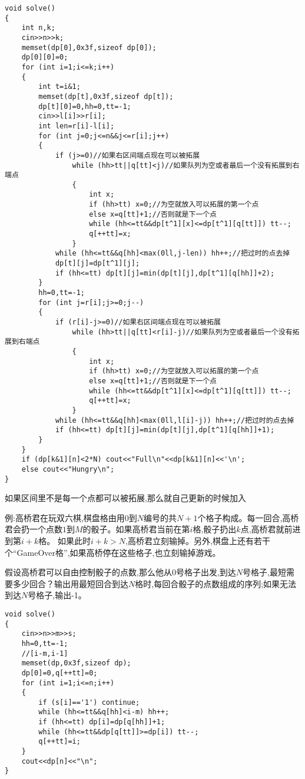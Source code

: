 \documentclass[a4paper]{ctexart}
\begin{document}
\begin{lstlisting}
void solve()
{
    int n,k;
    cin>>n>>k;
    memset(dp[0],0x3f,sizeof dp[0]);
    dp[0][0]=0;
    for (int i=1;i<=k;i++)
    {
        int t=i&1;
        memset(dp[t],0x3f,sizeof dp[t]);
        dp[t][0]=0,hh=0,tt=-1;
        cin>>l[i]>>r[i];
        int len=r[i]-l[i];
        for (int j=0;j<=n&&j<=r[i];j++)
        {
            if (j>=0)//如果右区间端点现在可以被拓展
                while (hh>tt||q[tt]<j)//如果队列为空或者最后一个没有拓展到右端点
                {
                    int x;
                    if (hh>tt) x=0;//为空就放入可以拓展的第一个点
                    else x=q[tt]+1;//否则就是下一个点
                    while (hh<=tt&&dp[t^1][x]<=dp[t^1][q[tt]]) tt--;
                    q[++tt]=x;
                }
            while (hh<=tt&&q[hh]<max(0ll,j-len)) hh++;//把过时的点去掉
            dp[t][j]=dp[t^1][j];
            if (hh<=tt) dp[t][j]=min(dp[t][j],dp[t^1][q[hh]]+2);
        }
        hh=0,tt=-1;
        for (int j=r[i];j>=0;j--)
        {
            if (r[i]-j>=0)//如果右区间端点现在可以被拓展
                while (hh>tt||q[tt]<r[i]-j)//如果队列为空或者最后一个没有拓展到右端点
                {
                    int x;
                    if (hh>tt) x=0;//为空就放入可以拓展的第一个点
                    else x=q[tt]+1;//否则就是下一个点
                    while (hh<=tt&&dp[t^1][x]<=dp[t^1][q[tt]]) tt--;
                    q[++tt]=x;
                }
            while (hh<=tt&&q[hh]<max(0ll,l[i]-j)) hh++;//把过时的点去掉
            if (hh<=tt) dp[t][j]=min(dp[t][j],dp[t^1][q[hh]]+1); 
        }
    }
    if (dp[k&1][n]<2*N) cout<<"Full\n"<<dp[k&1][n]<<'\n';
    else cout<<"Hungry\n";
}
\end{lstlisting}

如果区间里不是每一个点都可以被拓展,那么就自己更新的时候加入

例:高桥君在玩双六棋,棋盘格由用$0$到$N$编号的共$N+1$个格子构成。每一回合,高桥君会扔一个点数$1$到$M$的骰子。如果高桥君当前在第$i$格,骰子扔出$k$点,高桥君就前进到第$i+k$格。 如果此时$i+k > N$,高桥君立刻输掉。另外,棋盘上还有若干个“GameOver格”,如果高桥停在这些格子,也立刻输掉游戏。

假设高桥君可以自由控制骰子的点数,那么他从$0$号格子出发,到达$N$号格子,最短需要多少回合？输出用最短回合到达$N$格时,每回合骰子的点数组成的序列;如果无法到达$N$号格子,输出-1。

\begin{lstlisting}
void solve()
{
    cin>>n>>m>>s;
    hh=0,tt=-1;
    //[i-m,i-1]
    memset(dp,0x3f,sizeof dp);
    dp[0]=0,q[++tt]=0;
    for (int i=1;i<=n;i++)
    {
        if (s[i]=='1') continue;
        while (hh<=tt&&q[hh]<i-m) hh++;
        if (hh<=tt) dp[i]=dp[q[hh]]+1;
        while (hh<=tt&&dp[q[tt]]>=dp[i]) tt--;
        q[++tt]=i;
    }
    cout<<dp[n]<<"\n";
}  
\end{lstlisting}
\end{document}
